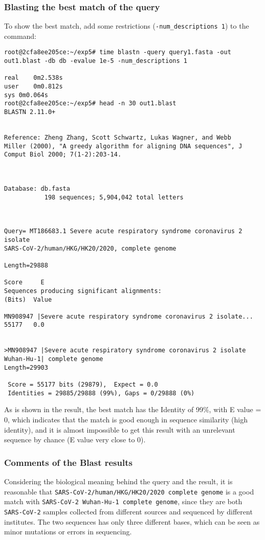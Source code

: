 \documentclass[en,black,10pt,normal]{elegantnote}
\begin{document}
\subsubsection{Blasting the best match of the query}
To show the best match, add some restrictions (\lstinline{-num_descriptions 1}) to the command:

\begin{lstlisting}
root@2cfa8ee205ce:~/exp5# time blastn -query query1.fasta -out out1.blast -db db -evalue 1e-5 -num_descriptions 1

real	0m2.538s
user	0m0.812s
sys	0m0.064s
root@2cfa8ee205ce:~/exp5# head -n 30 out1.blast 
BLASTN 2.11.0+


Reference: Zheng Zhang, Scott Schwartz, Lukas Wagner, and Webb
Miller (2000), "A greedy algorithm for aligning DNA sequences", J
Comput Biol 2000; 7(1-2):203-14.



Database: db.fasta
           198 sequences; 5,904,042 total letters



Query= MT186683.1 Severe acute respiratory syndrome coronavirus 2 isolate
SARS-CoV-2/human/HKG/HK20/2020, complete genome

Length=29888
                                                                      Score     E
Sequences producing significant alignments:                          (Bits)  Value

MN908947 |Severe acute respiratory syndrome coronavirus 2 isolate...  55177   0.0  


>MN908947 |Severe acute respiratory syndrome coronavirus 2 isolate 
Wuhan-Hu-1| complete genome
Length=29903

 Score = 55177 bits (29879),  Expect = 0.0
 Identities = 29885/29888 (99%), Gaps = 0/29888 (0%)
\end{lstlisting}
As is shown in the result, the best match has the Identity of 99\%, with E value = 0,
which indicates that the match is good enough in sequence similarity (high identity), 
and it is almost impossible to get this result with an unrelevant sequence by chance (E value very close to 0).

\subsubsection{Comments of the Blast results}
Considering the biological meaning behind the query and the result,
it is reasonable that \lstinline{SARS-CoV-2/human/HKG/HK20/2020 complete genome} 
is a good match with \lstinline{SARS-CoV-2 Wuhan-Hu-1 complete genome},
since they are both \lstinline{SARS-CoV-2} samples collected from different 
sources and sequenced by different institutes.
The two sequences has only three different bases, which can be seen as minor mutations or errors in sequencing.
\end{document}
